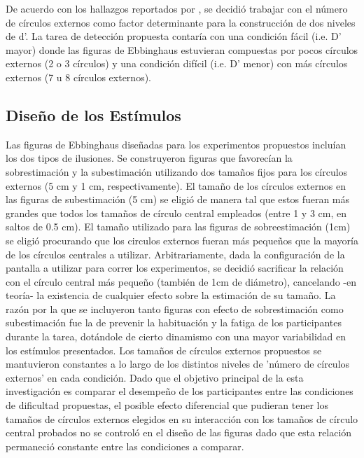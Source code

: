 De acuerdo con los hallazgos reportados por \parencite{Massaro1971}, se decidió trabajar con el número de círculos externos como factor determinante para la construcción de dos niveles de d'. La tarea de detección propuesta contaría con una condición fácil (i.e. D' mayor) donde las figuras de Ebbinghaus estuvieran compuestas por pocos círculos externos (2 o 3 círculos) y una condición difícil (i.e. D' menor) con más círculos externos (7 u 8 círculos externos).\\ 

\subsection{Diseño de los Estímulos}

Las figuras de Ebbinghaus diseñadas para los experimentos propuestos incluían los dos tipos de ilusiones. Se construyeron figuras que favorecían la sobrestimación y la subestimación utilizando dos tamaños fijos para los círculos externos (5 cm y 1 cm, respectivamente). El tamaño de los círculos externos en las figuras de subestimación (5 cm) se eligió de manera tal que estos fueran más grandes que todos los tamaños de círculo central empleados (entre 1 y 3 cm, en saltos de 0.5 cm). El tamaño utilizado para las figuras de sobreestimación (1cm) se eligió procurando que los circulos externos fueran más pequeños que la mayoría de los círculos centrales a utilizar. Arbitrariamente, dada la configuración de la pantalla a utilizar para correr los experimentos, se decidió sacrificar la relación con el círculo central más pequeño (también de 1cm de diámetro), cancelando -en teoría- la existencia de cualquier efecto sobre la estimación de su tamaño. La razón por la que se incluyeron tanto figuras con efecto de sobrestimación como subestimación fue la de prevenir la habituación y la fatiga de los participantes durante la tarea, dotándole de cierto dinamismo con una mayor variabilidad en los estímulos presentados. Los tamaños de círculos externos propuestos se mantuvieron constantes a lo largo de los distintos niveles de 'número de círculos externos' en cada condición. Dado que el objetivo principal de la esta investigación es comparar el desempeño de los participantes entre las condiciones de dificultad propuestas, el posible efecto diferencial que pudieran tener los tamaños de círculos externos elegidos en su interacción con los tamaños de círculo central probados no se controló en el diseño de las figuras dado que esta relación permaneció constante entre las condiciones a comparar.\\


